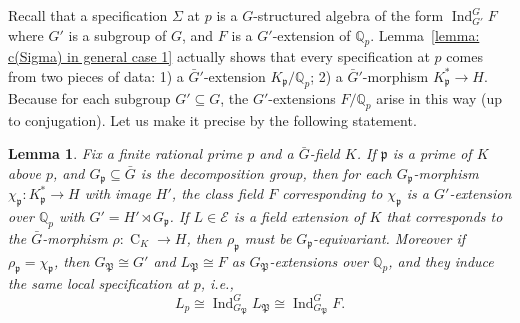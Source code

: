 \documentclass{amsart}
\numberwithin{equation}{section}
\theoremstyle{plain}
\newtheorem{lemma}[theorem]{Lemma}
\theoremstyle{definition}
\theoremstyle{remark}
\begin{document}
Recall that a specification $\Sigma$ at $p$ is a $G$-structured algebra of the form $\operatorname{Ind}^G_{G'}F$ where $G'$ is a subgroup of $G$, and $F$ is a $G'$-extension of $\mathbb{Q}_p$.
Lemma~\ref{lemma: c(Sigma) in general case 1} actually shows that every specification at $p$ comes from two pieces of data:
1) a $\bar{G}'$-extension $K_{\mathfrak{p}}/\mathbb{Q}_p$; 
2) a $\bar{G}'$-morphism $K_{\mathfrak{p}}^*\to H$.
Because for each subgroup $G'\subseteq G$, the $G'$-extensions $F/\mathbb{Q}_p$ arise in this way (up to conjugation).
Let us make it precise by the following statement.
\begin{lemma}\label{lemma: c(Sigma) in general case 2}
    Fix a finite rational prime $p$ and a $\bar{G}$-field $K$.
	If $\mathfrak{p}$ is a prime of $K$ above $p$, and $G_{\mathfrak{p}}\subseteq\bar{G}$ is the decomposition group, then for each $G_{\mathfrak{p}}$-morphism $\chi_{\mathfrak{p}}:K_{\mathfrak{p}}^*\to H$ with image $H'$, the class field $F$ corresponding to $\chi_{\mathfrak{p}}$ is a $G'$-extension over $\mathbb{Q}_p$ with $G'=H'\rtimes G_{\mathfrak{p}}$.
	If $L\in\mathcal{E}$ is a field extension of $K$ that corresponds to the $\bar{G}$-morphism $\rho:\operatorname{C}_K\to H$, then $\rho_{\mathfrak{p}}$ must be $G_{\mathfrak{p}}$-equivariant.
	Moreover if $\rho_{\mathfrak{p}}=\chi_{\mathfrak{p}}$, then $G_{\mathfrak{P}}\cong G'$ and $L_{\mathfrak{P}}\cong F$ as $G_{\mathfrak{P}}$-extensions over $\mathbb{Q}_p$, and they induce the same local specification at $p$, i.e.,
	\begin{equation*}
		L_p\cong\operatorname{Ind}^G_{G_{\mathfrak{P}}}L_{\mathfrak{P}}\cong\operatorname{Ind}^G_{G_{\mathfrak{P}}}F.
	\end{equation*}
\end{lemma}
\end{document}
